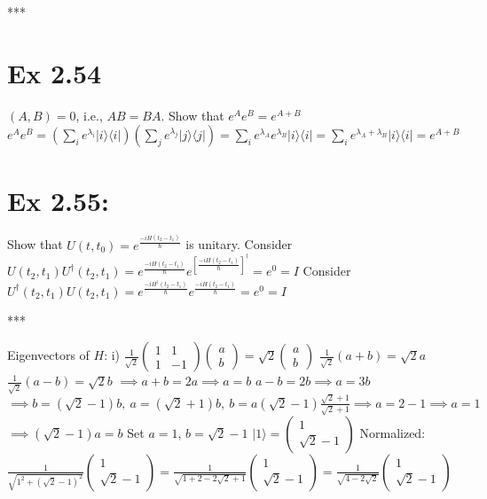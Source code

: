 \documentclass{article}
\newcommand{\0}{{$|0\rangle$}}
\newcommand{\1}{{$|1\rangle$}}
\begin{document}
***
\newpage
\section*{Ex 2.54}
$(A,B)=0$, i.e., $AB=BA$.  
Show that $e^{A}e^{B}=e^{A+B}$  
$e^A e^B = \left(\sum_i e^{\lambda_i} |i\rangle\langle i|\right)\left(\sum_j e^{\lambda_j} |j\rangle\langle j|\right) = \sum_i e^{\lambda_A}e^{\lambda_B} |i\rangle\langle i| = \sum_i e^{\lambda_A+\lambda_B} |i\rangle\langle i| = e^{A+B}$

\newpage
\section*{Ex 2.55: } 

Show that $U(t,t_0) = e^{\frac{-iH(t_2-t_1)}{\hbar}}$ is unitary.  
Consider $U(t_2, t_1)U^{\dagger}(t_2, t_1) = e^{\frac{-iH(t_2-t_1)}{\hbar}}e^{[\frac{-iH(t_2-t_1)}{\hbar}]^{\dagger}} = e^0 = I $  
Consider $U^{\dagger}(t_2, t_1) U(t_2,t_1) = e^{\frac{-iH^{\dagger}(t_2-t_1)}{\hbar}} e^{\frac{-iH(t_2-t_1)}{\hbar}} = e^0 = I$


***

Eigenvectors of $H$:  
i) $\frac{1}{\sqrt{2}}\begin{pmatrix} 1 & 1 \\ 1 & -1 \end{pmatrix} \begin{pmatrix} a \\ b \end{pmatrix} = \sqrt{2}\begin{pmatrix} a \\ b \end{pmatrix}$  
$\frac{1}{\sqrt{2}}(a+b) = \sqrt{2}a$  
$\frac{1}{\sqrt{2}}(a-b) = \sqrt{2}b$  
$\implies a+b=2a \implies a=b$  
$a-b=2b \implies a=3b$  
$\implies b = (\sqrt{2}-1)b, \ a = (\sqrt{2}+1)b, \ b=a(\sqrt{2}-1) \frac{\sqrt{2}+1}{\sqrt{2}+1} \implies a=2-1 \implies a=1$  
$\implies (\sqrt{2}-1)a = b$  
Set $a=1$, $b = \sqrt{2}-1$  
$|1\rangle = \begin{pmatrix} 1 \\ \sqrt{2}-1 \end{pmatrix}$  
Normalized:  
$\frac{1}{\sqrt{1^2 + (\sqrt{2}-1)^2}} \begin{pmatrix} 1 \\ \sqrt{2}-1 \end{pmatrix} = \frac{1}{\sqrt{1 + 2 - 2\sqrt{2} + 1}} \begin{pmatrix} 1 \\ \sqrt{2}-1 \end{pmatrix} = \frac{1}{\sqrt{4 - 2\sqrt{2}}} \begin{pmatrix} 1 \\ \sqrt{2}-1 \end{pmatrix}$
\end{document}
